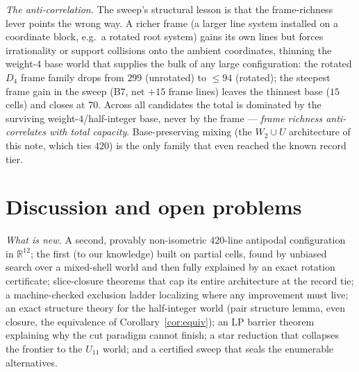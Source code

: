 \documentclass[11pt]{article}
\theoremstyle{remark}
\newcommand{\RR}{\mathbb{R}}
\begin{document}
\emph{The anti-correlation.} The sweep's structural lesson is that the
frame-richness lever points the wrong way. A richer frame (a larger line
system installed on a coordinate block, e.g.\ a rotated root system)
gains its own lines but forces irrationality or support collisions onto
the ambient coordinates, thinning the weight-$4$ base world that supplies
the bulk of any large configuration: the rotated $D_4$ frame family drops
from $299$ (unrotated) to $\le94$ (rotated); the steepest frame gain in
the sweep (B7, net $+15$ frame lines) leaves the thinnest base
($15$ cells) and closes at $70$. Across all candidates the total is
dominated by the surviving weight-$4$/half-integer base, never by the
frame --- \emph{frame richness anti-correlates with total capacity}.
Base-preserving mixing (the $W_2\cup U$ architecture of this note, which
ties $420$) is the only family that even reached the known record tier.

\section{Discussion and open problems}\label{sec:disc}

\emph{What is new.} A second, provably non-isometric $420$-line antipodal
configuration in $\RR^{12}$; the first (to our knowledge) built on partial
cells, found by unbiased search over a mixed-shell world and then fully
explained by an exact rotation certificate; slice-closure theorems that
cap its entire architecture at the record tie; a machine-checked exclusion
ladder localizing where any improvement must live; an exact structure
theory for the half-integer world (pair structure lemma, even closure, the
equivalence of Corollary~\ref{cor:equiv}); an LP barrier theorem
explaining why the cut paradigm cannot finish; a star reduction that
collapses the frontier to the $U_{11}$ world; and a certified sweep that
seals the enumerable alternatives.
\end{document}
